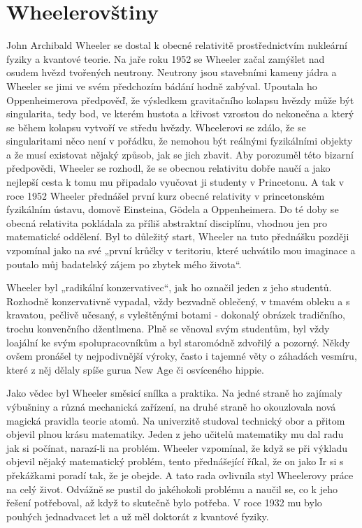 \section{Wheelerovštiny}\label{kulIchIIIsecVIII} 
  John Archibald Wheeler se dostal k obecné relativitě prostřednictvím nukleární fyziky a kvantové
  teorie. Na jaře roku 1952 se Wheeler začal zamýšlet nad osudem hvězd tvořených neutrony. Neutrony
  jsou stavebními kameny jádra a Wheeler se jimi ve svém předchozím bádání hodně zabýval. Upoutala
  ho Oppenheimerova předpověď, že výsledkem gravitačního kolapsu hvězdy může být singularita, tedy
  bod, ve kterém hustota a křivost vzrostou do nekonečna a který se během kolapsu vytvoří ve středu
  hvězdy. Wheelerovi se zdálo, že se singularitami něco není v pořádku, že nemohou být reálnými
  fyzikálními objekty a že musí existovat nějaký způsob, jak se jich zbavit. Aby porozuměl této
  bizarní předpovědi, Wheeler se rozhodl, že se obecnou relativitu dobře naučí a jako nejlepší cesta
  k tomu mu připadalo vyučovat ji studenty v Princetonu. A tak v roce 1952 Wheeler přednášel první
  kurz obecné relativity v princetonském fyzikálním ústavu, domově Einsteina, Gödela a Oppenheimera.
  Do té doby se obecná relativita pokládala za příliš abstraktní disciplínu, vhodnou jen pro
  matematické oddělení. Byl to důležitý start, Wheeler na tuto přednášku později vzpomínal jako na
  své „první krůčky v teritoriu, které uchvátilo mou imaginace a poutalo můj badatelský zájem po
  zbytek mého života“. 

  Wheeler byl „radikální konzervativec“, jak ho označil jeden z jeho studentů. Rozhodně
  konzervativně vypadal, vždy bezvadně oblečený, v tmavém obleku a s kravatou, pečlivě učesaný, s
  vyleštěnými botami - dokonalý obrázek tradičního, trochu konvenčního džentlmena. Plně se věnoval
  svým studentům, byl vždy loajální ke svým spolupracovníkům a byl staromódně zdvořilý a pozorný.
  Někdy ovšem pronášel ty nejpodivnější výroky, často i tajemné věty o záhadách vesmíru, které z něj
  dělaly spíše gurua New Age či osvíceného hippie. 

  Jako vědec byl Wheeler směsicí snílka a praktika. Na jedné straně ho zajímaly výbušniny a různá
  mechanická zařízení, na druhé straně ho okouzlovala nová magická pravidla teorie atomů. Na
  univerzitě studoval technický obor a přitom objevil plnou krásu matematiky. Jeden z jeho učitelů
  matematiky mu dal radu jak si počínat, narazí-li na problém. Wheeler vzpomínal, že když se při
  výkladu objevil nějaký matematický problém, tento přednášející říkal, že on jako Ir si s
  překážkami poradí tak, že je obejde. A tato rada ovlivnila styl Wheelerovy práce na celý život.
  Odvážně se pustil do jakéhokoli problému a naučil se, co k jeho řešení potřeboval, až když to
  skutečně bylo potřeba. V roce 1932 mu bylo pouhých jednadvacet let a už měl doktorát z kvantové
  fyziky. 

